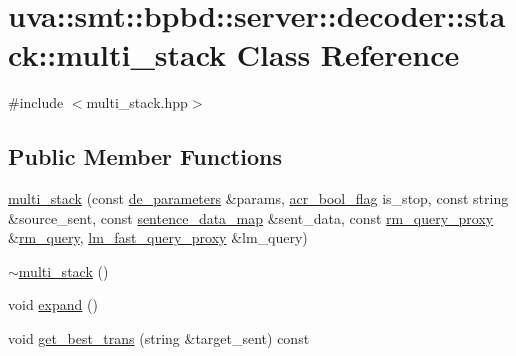 \hypertarget{classuva_1_1smt_1_1bpbd_1_1server_1_1decoder_1_1stack_1_1multi__stack}{}\section{uva\+:\+:smt\+:\+:bpbd\+:\+:server\+:\+:decoder\+:\+:stack\+:\+:multi\+\_\+stack Class Reference}
\label{classuva_1_1smt_1_1bpbd_1_1server_1_1decoder_1_1stack_1_1multi__stack}


{\ttfamily \#include $<$multi\+\_\+stack.\+hpp$>$}

\subsection*{Public Member Functions}
\begin{DoxyCompactItemize}
\item 
\hyperlink{classuva_1_1smt_1_1bpbd_1_1server_1_1decoder_1_1stack_1_1multi__stack_a227be04b3dca60a5bb7abc8b6b385bda}{multi\+\_\+stack} (const \hyperlink{namespaceuva_1_1smt_1_1bpbd_1_1server_1_1decoder_aaf4d5faf3a48156401c854d163d4b848}{de\+\_\+parameters} \&params, \hyperlink{namespaceuva_1_1utils_1_1threads_a1c174d3a90b2b056554d897188ad2c74}{acr\+\_\+bool\+\_\+flag} is\+\_\+stop, const string \&source\+\_\+sent, const \hyperlink{namespaceuva_1_1smt_1_1bpbd_1_1server_1_1decoder_1_1sentence_a95d9e3bcc492d0c638368631e3701ebb}{sentence\+\_\+data\+\_\+map} \&sent\+\_\+data, const \hyperlink{classuva_1_1smt_1_1bpbd_1_1server_1_1rm_1_1proxy_1_1rm__query__proxy}{rm\+\_\+query\+\_\+proxy} \&\hyperlink{classuva_1_1smt_1_1bpbd_1_1server_1_1rm_1_1models_1_1rm__query}{rm\+\_\+query}, \hyperlink{classuva_1_1smt_1_1bpbd_1_1server_1_1lm_1_1proxy_1_1lm__fast__query__proxy}{lm\+\_\+fast\+\_\+query\+\_\+proxy} \&lm\+\_\+query)
\item 
\hyperlink{classuva_1_1smt_1_1bpbd_1_1server_1_1decoder_1_1stack_1_1multi__stack_a11b410c459d65de9d5fad75b9f6d1915}{$\sim$multi\+\_\+stack} ()
\item 
void \hyperlink{classuva_1_1smt_1_1bpbd_1_1server_1_1decoder_1_1stack_1_1multi__stack_a4fa31af98499df085bdc36d9542261f8}{expand} ()
\item 
void \hyperlink{classuva_1_1smt_1_1bpbd_1_1server_1_1decoder_1_1stack_1_1multi__stack_ab2fd128f52576f6e3ff658cff9b7a627}{get\+\_\+best\+\_\+trans} (string \&target\+\_\+sent) const 
\end{DoxyCompactItemize}
